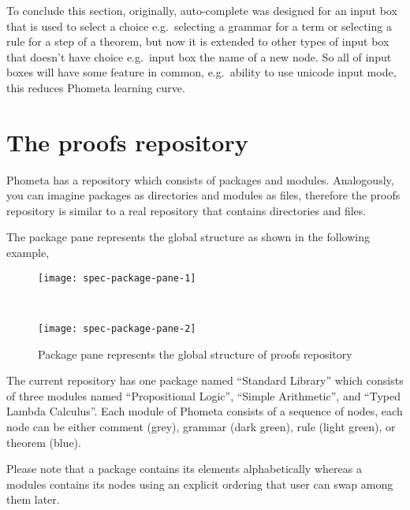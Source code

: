 \documentclass[master.tex]{subfiles}
\begin{document}
To conclude this section, originally, auto-complete was designed for an input
box that is used to select a choice e.g.\ selecting a grammar for a term or
selecting a rule for a step of a theorem, but now it is extended to other types
of input box that doesn't have choice e.g.\ input box the name of a new node. So
all of input boxes will have some feature in common, e.g.\ ability to
use unicode input mode, this reduces Phometa learning curve.

\section{The proofs repository}

Phometa has a repository which consists of packages and modules. Analogously,
you can imagine packages as directories and modules as files, therefore the
proofs repository is similar to a real repository that contains directories and
files.

The package pane represents the global structure as shown in the following
example,

\begin{figure}[H]
    \centering

\begin{minipage}{0.35\textwidth}
\begin{flushleft}
    \texttt{[image: spec-package-pane-1]}
\end{flushleft}
\end{minipage}
~
\begin{minipage}{0.35\textwidth}
\begin{flushright}
    \texttt{[image: spec-package-pane-2]}
\end{flushright}
\end{minipage}

\caption{Package pane represents the global structure of proofs repository}
\label{fig:specification-package-pane}
\end{figure}

The current repository has one package named ``Standard Library'' which consists
of three modules named ``Propositional Logic'', ``Simple Arithmetic'', and
``Typed Lambda Calculus''. Each module of Phometa consists of a sequence of
nodes, each node can be either comment (grey), grammar (dark green), rule (light
green), or theorem (blue).

Please note that a package contains its elements alphabetically whereas a
modules contains its nodes using an explicit ordering that user can swap among
them later.
\end{document}
